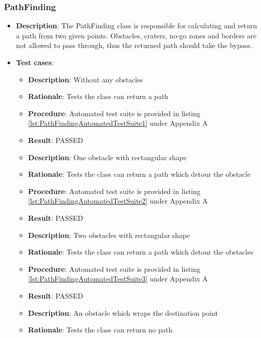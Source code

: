 \documentclass[12pt,a4paper]{article}
\begin{document}
    \subsubsection{PathFinding}
	\begin{itemize}
	\item \textbf{Description}: The PathFinding class is responsible for calculating and return a path from two given points.  Obstacles, craters, no-go zones and borders are not allowed to pass through, thus the returned path should take the bypass.
	\item \textbf{Test cases}:
	\begin{itemize}
		\item \textbf{Description}:	Without any obstacles
		\item \textbf{Rationale}: Tests the class can return a path
		\item \textbf{Procedure}: Automated test suite is provided in listing \ref{lst:PathFindingAutomatedTestSuite1} under Appendix A
		\item \textbf{Result}: PASSED
	\end{itemize}
    \begin{itemize}
		\item \textbf{Description}:	One obstacle with rectangular shape
		\item \textbf{Rationale}: Tests the class can return a path which detour the obstacle
		\item \textbf{Procedure}: Automated test suite is provided in listing \ref{lst:PathFindingAutomatedTestSuite2} under Appendix A
		\item \textbf{Result}: PASSED
	\end{itemize}
    \begin{itemize}
		\item \textbf{Description}:	Two obstacles with rectangular shape
		\item \textbf{Rationale}: Tests the class can return a path which detour the obstacles
		\item \textbf{Procedure}: Automated test suite is provided in listing \ref{lst:PathFindingAutomatedTestSuite3} under Appendix A
		\item \textbf{Result}: PASSED
	\end{itemize}
    \begin{itemize}
		\item \textbf{Description}:	An obstacle which wraps the destination point
		\item \textbf{Rationale}: Tests the class can return no path

\end{itemize}
\end{itemize}
\end{document}
